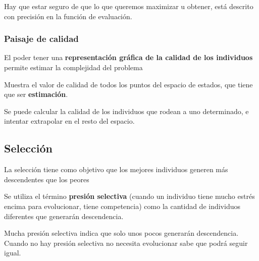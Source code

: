 \documentclass[12pt, twoside, openright]{report} %
\begin{document}
Hay que estar seguro de que lo que queremos maximizar u obtener, está descrito con precisión en la función de evaluación.
\subsubsection{Paisaje de calidad}
El poder tener una \textbf{representación gráfica de la calidad de los individuos} permite estimar la complejidad del problema

Muestra el valor de calidad de todos los puntos del espacio de estados, que tiene que ser \textbf{estimación}.

Se puede calcular la calidad de los individuos que rodean a uno determinado, e intentar extrapolar en el resto del espacio.

\subsection{Selección}
La selección tiene como objetivo que los mejores individuos generen más descendentes que los peores

Se utiliza el término \textbf{presión selectiva} (cuando un individuo tiene mucho estrés encima para evolucionar, tiene competencia) como la cantidad de individuos diferentes que generarán descendencia.

Mucha presión selectiva indica que solo unos pocos generarán descendencia. Cuando no hay presión selectiva no necesita evolucionar sabe que podrá seguir igual.
\end{document}
